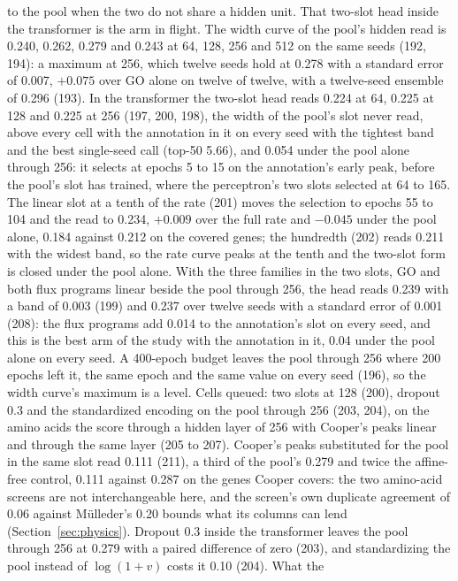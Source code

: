 to the pool when the two do not share a hidden unit. That two-slot head inside the
transformer is the arm in flight. The width curve of the pool's hidden read is 0.240,
0.262, 0.279 and 0.243 at 64, 128, 256 and 512 on the same seeds (192, 194): a
maximum at 256, which twelve seeds hold at 0.278 with a standard error of 0.007,
$+0.075$ over GO alone on twelve of twelve, with a twelve-seed ensemble of 0.296 (193).
In the transformer the two-slot head reads 0.224 at 64, 0.225 at 128 and 0.225 at 256
(197, 200, 198), the width of the pool's slot never read,
above every cell with the annotation in it on every seed with the tightest band and
the best single-seed call (top-50 5.66), and 0.054 under the pool alone through 256:
it selects at epochs 5 to 15 on the annotation's early peak, before the pool's slot
has trained, where the perceptron's two slots selected at 64 to 165. The linear slot at a tenth of the rate (201) moves the
selection to epochs 55 to 104 and the read to 0.234, $+0.009$ over the full rate and
$-0.045$ under the pool alone, 0.184 against 0.212 on the covered genes; the hundredth
(202) reads 0.211 with the widest band, so the rate curve peaks at the tenth and the
two-slot form is closed under the pool alone. With the three
families in the two slots, GO and both flux programs linear beside the pool through
256, the head reads 0.239 with a band of 0.003 (199) and 0.237 over twelve seeds with
a standard error of 0.001 (208): the flux programs add 0.014 to the annotation's slot
on every seed, and this is the best arm of the study with the annotation in it, 0.04
under the pool alone on every seed. A 400-epoch budget leaves the pool through
256 where 200 epochs left it, the same epoch and the same value on every seed (196), so
the width curve's maximum is a level. Cells queued: two slots at 128 (200), dropout 0.3
and the standardized encoding on the pool through 256 (203, 204), on the amino acids
the score through a hidden layer of 256 with Cooper's peaks linear and through the same
layer (205 to 207). Cooper's peaks substituted for the pool in the same slot read
0.111 (211), a third of the pool's 0.279 and twice the affine-free control, 0.111
against 0.287 on the genes Cooper covers: the two amino-acid screens are not
interchangeable here, and the screen's own duplicate agreement of 0.06 against
M\"ulleder's 0.20 bounds what its columns can lend
(Section~\ref{sec:physics}). Dropout 0.3 inside the transformer
leaves the pool through 256 at 0.279 with a paired difference of zero (203), and
standardizing the pool instead of $\log(1+v)$ costs it 0.10 (204). What the
